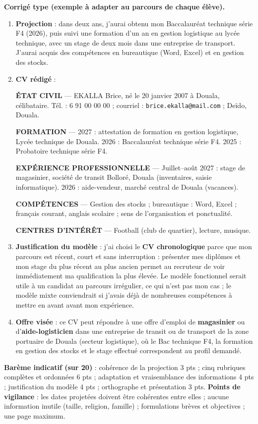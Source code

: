 \documentclass[11pt]{article}
\newcommand{\cle}[1]{{\popxbold\color{popdark}#1}}
\begin{document}
\begin{corrige}[Exercice 11 — Type Bac : projet personnel de \cle{CV}]
\textbf{Corrigé type (exemple à adapter au parcours de chaque élève).}
\begin{enumerate}
\item \textbf{Projection} : dans deux ans, j'aurai obtenu mon Baccalauréat technique série F4 (2026), puis suivi une formation d'un an en gestion logistique au lycée technique, avec un stage de deux mois dans une entreprise de transport. J'aurai acquis des compétences en bureautique (Word, Excel) et en gestion des stocks.
\item \textbf{\cle{CV} rédigé} :

\textbf{ÉTAT CIVIL} — EKALLA Brice, né le 20 janvier 2007 à Douala, célibataire. Tél. : 6 91 00 00 00 ; courriel : \texttt{brice.ekalla@mail.com} ; Deïdo, Douala.

\textbf{FORMATION} — 2027 : attestation de formation en gestion logistique, Lycée technique de Douala. 2026 : Baccalauréat technique série F4. 2025 : Probatoire technique série F4.

\textbf{EXPÉRIENCE PROFESSIONNELLE} — Juillet--août 2027 : stage de magasinier, société de transit Bolloré, Douala (inventaires, saisie informatique). 2026 : aide-vendeur, marché central de Douala (vacances).

\textbf{COMPÉTENCES} — Gestion des stocks ; bureautique : Word, Excel ; français courant, anglais scolaire ; sens de l'organisation et ponctualité.

\textbf{CENTRES D'INTÉRÊT} — Football (club de quartier), lecture, musique.

\item \textbf{Justification du modèle} : j'ai choisi le \textbf{\cle{CV chronologique}} parce que mon parcours est récent, court et sans interruption : présenter mes diplômes et mon stage du plus récent au plus ancien permet au recruteur de voir immédiatement ma qualification la plus élevée. Le modèle fonctionnel serait utile à un candidat au parcours irrégulier, ce qui n'est pas mon cas ; le modèle mixte conviendrait si j'avais déjà de nombreuses compétences à mettre en avant avant mon expérience.
\item \textbf{Offre visée} : ce \cle{CV} peut répondre à une offre d'emploi de \textbf{magasinier} ou d'\textbf{aide-logisticien} dans une entreprise de transit ou de transport de la zone portuaire de Douala (secteur logistique), où le Bac technique F4, la formation en gestion des stocks et le stage effectué correspondent au profil demandé.
\end{enumerate}
\textbf{Barème indicatif (sur 20)} : cohérence de la projection 3 pts ; cinq rubriques complètes et ordonnées 6 pts ; adaptation et vraisemblance des informations 4 pts ; justification du modèle 4 pts ; orthographe et présentation 3 pts.
\textbf{Points de vigilance} : les dates projetées doivent être cohérentes entre elles ; aucune information inutile (taille, religion, famille) ; formulations brèves et objectives ; une page maximum.
\end{corrige}
\end{document}
